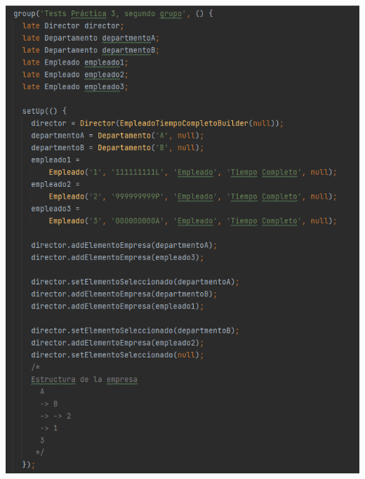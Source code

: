 \documentclass[openany]{article}
\begin{document}
\includegraphics[width=6.26772in,height=8.29167in]{imagenes/testGrupo2.png}
\end{document}

